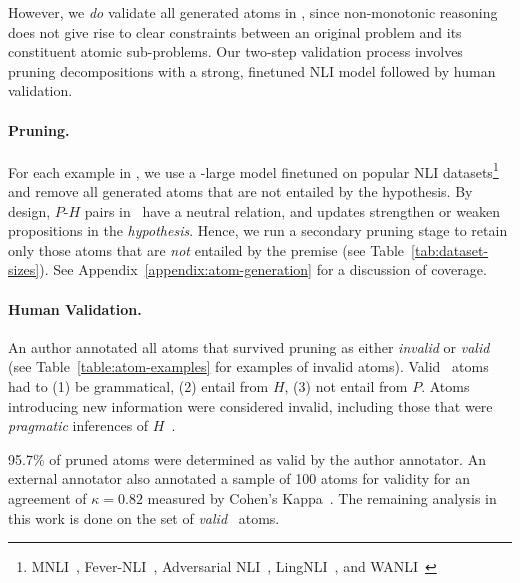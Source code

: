 However, we \textit{do} validate all generated atoms in \dsnlitest, since non-monotonic reasoning does not give rise to clear constraints between an original problem and its constituent atomic sub-problems.
%
Our two-step validation process involves pruning decompositions with a strong, finetuned NLI model followed by human validation.

\paragraph{Pruning.} For each example in \dsnlitest, we use a -large model finetuned on popular NLI datasets\footnote{MNLI~\cite{williams-etal-2018-broad}, Fever-NLI~\cite{thorne-etal-2018-fever}, Adversarial NLI~\cite{nie-etal-2020-adversarial}, LingNLI~\cite{parrish-etal-2021-putting-linguist}, and WANLI~\cite{liu-etal-2022-wanli}} and remove all generated atoms that are not entailed by the hypothesis.
%
By design, $P$-$H$ pairs in \dsnli~have a neutral relation, and updates strengthen or weaken propositions in the \textit{hypothesis}.
%
Hence, we run a secondary pruning stage to retain only those atoms that are \textit{not} entailed by the premise (see Table~\ref{tab:dataset-sizes}).
%
See Appendix~\ref{appendix:atom-generation} for a discussion of coverage.
%
\paragraph{Human Validation.} An author annotated all atoms that survived pruning as either \textit{invalid} or \textit{valid} (see Table~\ref{table:atom-examples} for examples of invalid atoms).
%
Valid \dsnli~atoms had to (1) be grammatical, (2) entail from $H$, (3) not entail from $P$.
%
Atoms introducing new information were considered invalid, including those that were \textit{pragmatic} inferences of $H$~\cite{jeretic-etal-2020-natural, srikanth-etal-2024-pregnant}.
%

95.7\% of pruned atoms were determined as valid by the author annotator.
%
An external annotator also annotated a sample of 100 atoms for validity for an agreement of $\kappa=0.82$ measured by Cohen's Kappa~\cite{cohen1960coefficient}.
%
The remaining analysis in this work is done on the set of \textit{valid} \dsnli~atoms.